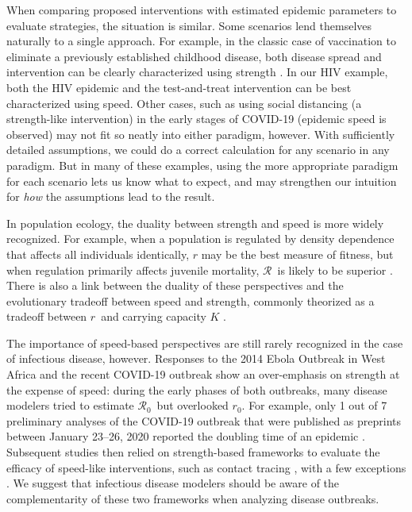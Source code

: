 \documentclass[12pt]{article}
\newcommand{\RR}{\ensuremath{{\mathcal R}}}
\newcommand{\Rx}[1]{\ensuremath{\RR_{\mathrm{#1}}}}
\newcommand{\Ro}{\Rx{0}}
\newcommand{\rr}{\ensuremath{{r}}}
\newcommand{\rx}[1]{\ensuremath{\rr_{\mathrm{#1}}}}
\newcommand{\ro}{\rx{0}}
\begin{document}
When comparing proposed interventions with estimated epidemic parameters to evaluate strategies, the situation is similar. Some scenarios lend themselves naturally to a single approach. For example, in the classic case of vaccination to eliminate a previously established childhood disease, both disease spread and intervention can be clearly characterized using strength \citep{anderson1985vaccination}. In our HIV example, both the HIV epidemic and the test-and-treat intervention can be best characterized using speed. Other cases, such as using social distancing (a strength-like intervention) in the early stages of COVID-19 (epidemic speed is observed) may not fit so neatly into either paradigm, however.
With sufficiently detailed assumptions, we could do a correct calculation for any scenario in any paradigm. 
But in many of these examples, using the more appropriate paradigm for each scenario lets us know what to expect, and may strengthen our intuition for \emph{how} the assumptions lead to the result.

In population ecology, the duality between strength and speed is more widely recognized.
For example, when a population is regulated by density dependence that affects all individuals identically, $r$ may be the best measure of fitness, 
but when regulation primarily affects juvenile mortality, \RR\ is likely to be superior \citep{mylius1995evolutionarily,pasztor1996r0}.
There is also a link between the duality of these perspectives and the evolutionary tradeoff between speed and strength, commonly theorized as a tradeoff between \rr\ and carrying capacity $K$ \cite{Pianka70}.

The importance of speed-based perspectives are still rarely recognized in the case of infectious disease, however. 
Responses to the 2014 Ebola Outbreak in West Africa and the recent COVID-19 outbreak show an over-emphasis on strength at the expense of speed:   
during the early phases of both outbreaks, many disease modelers tried to estimate \Ro\ but overlooked \ro.
For example, only 1 out of 7 preliminary analyses of the COVID-19 outbreak that were published as preprints between January 23--26, 2020 reported the doubling time of an epidemic \citep{bedfordncov, imaincov, liuncov, majumderncov, readncov, riouncov, zhaoncov}.
Subsequent studies then relied on strength-based frameworks to evaluate the efficacy of speed-like interventions, such as contact tracing \cite{hellewell2020feasibility,kretzschmar2020impact,kucharski2020contact}, with a few exceptions \cite{ferretti2020quantifying}.
We suggest that infectious disease modelers should be aware of the complementarity of these two frameworks when analyzing disease outbreaks.
\end{document}
